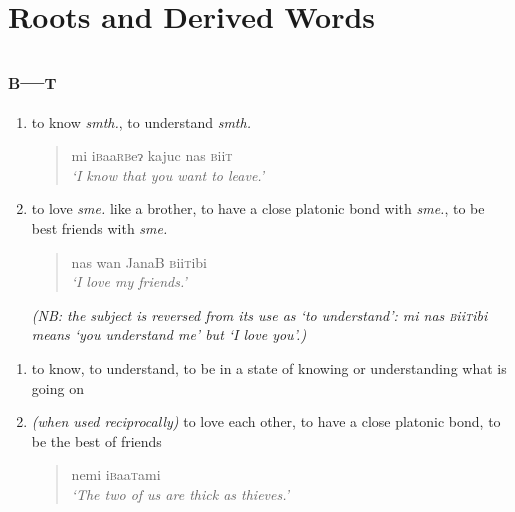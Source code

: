 \documentclass[a4paper,10pt,twoside,openright]{memoir}
\newcommand{\lilglot}{ɂ}
\newcommand{\famword}[5]{#1\textsc{#2}#3\textsc{#4}#5}
\begin{document}
\chapter{Roots and Derived Words}
\begin{multicols*}{2}
\section{\textsc{b---t}}
\begin{description}
    \begin{enumerate}
        \item to know \textit{smth.}, to understand \textit{smth.}
        \begin{quote}
            mi i\textsc{b}aa\textsc{rb}e\lilglot{} kajuc nas \textsc{b}ii\textsc{t}\\
            \textit{`I know that you want to leave.'}
        \end{quote}
        \item to love \textit{sme.} like a brother, to have a close platonic bond with \textit{sme.}, to be best friends with \textit{sme.}
        \begin{quote}
            nas wan \textsc{J}ana\textsc{B} \textsc{b}ii\textsc{t}ibi\\
            \textit{`I love my friends.'}
        \end{quote}
        \textit{(NB: the subject is reversed from its use as `to understand': \emph{mi nas \textsc{b}ii\textsc{t}ibi} means `you understand me' but `I love you'.)}
    \end{enumerate}
    \newentry{\famword{i}{b}{aa}{t}{}}{v.intr.}
    \begin{enumerate}
        \item to know, to understand, to be in a state of knowing or understanding what is going on
        \item \textit{(when used reciprocally)} to love each other, to have a close platonic bond, to be the best of friends
        \begin{quote}
            nemi i\textsc{b}aa\textsc{t}ami\\
            \textit{`The two of us are thick as thieves.'}
        \end{quote}
    \end{enumerate}
\end{description}


\end{multicols*}
\end{document}

